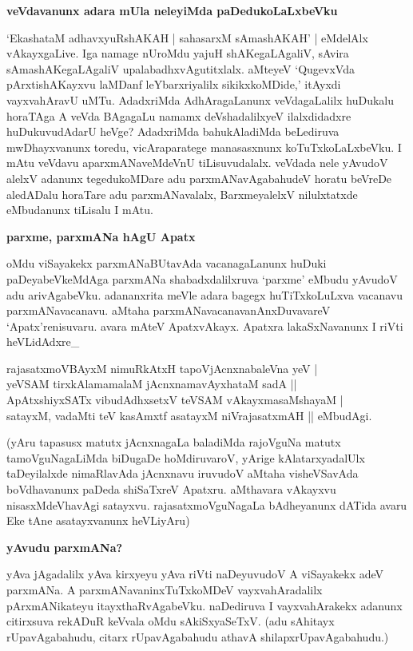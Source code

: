 {\bigskip
\noindent
{\large\bf veVdavanunx adara mUla neleyiMda paDedukoLaLxbeVku}}\label{page135}
\medskip

\noindent
`EkashataM adhavxyuRshAKAH | sahasarxM sAmashAKAH' |\label{135} eMdelAlx vAkayxgaLive. Iga namage nUroMdu yajuH shAKegaLAgaliV, sAvira sAmashAKegaLAgaliV upalabadhxvAgutitxlalx. aMteyeV `QugevxVda pArxtishAKayxvu laMDanf leYbarxriyalilx sikikxkoMDide,' itAyxdi vayxvahAravU uMTu. AdadxriMda AdhAragaLanunx veVdagaLalilx huDukalu horaTAga A veVda BAgagaLu namamx deVshadalilxyeV ilalxdidadxre huDukuvudAdarU heVge? AdadxriMda bahukAladiMda beLediruva mwDhayxvanunx toredu, vicAraparatege manasasxnunx koTuTxkoLaLxbeVku. I mAtu veVdavu aparxmANaveMdeVnU tiLisuvudalalx. veVdada nele yAvudoV alelxV adanunx tegedukoMDare adu parxmANavAgabahudeV horatu beVreDe aledADalu horaTare adu parxmANavalalx, BarxmeyalelxV nilulxtatxde eMbudanunx tiLisalu I mAtu.

{\bigskip
\noindent
{\large\bf parxme, parxmANa hAgU Apatx}}\label{page135a}
\medskip

\noindent
oMdu viSayakekx parxmANaBUtavAda vacanagaLanunx huDuki paDeyabeVkeMdAga parxmANa shabadxdalilxruva `parxme' eMbudu yAvudoV adu arivAgabeVku. adananxrita meVle adara bagegx huTiTxkoLuLxva vacanavu parxmANavacanavu. aMtaha parxmANavacanavanAnxDuvavareV `Apatx'renisuvaru. avara mAteV ApatxvAkayx. Apatxra lakaSxNavanunx I riVti heVLidAdxre\_

\begin{shloka}
rajasatxmoVBAyxM nimuRkAtxH tapoVjAcnxnabaleVna yeV |\\\label{135a}
yeVSAM tirxkAlamamalaM jAcnxnamavAyxhataM sadA ||\\
ApAtxshiyxSATx vibudAdhxsetxV teVSAM vAkayxmasaMshayaM |\\
satayxM, vadaMti teV kasAmxtf asatayxM niVrajasatxmAH || eMbudAgi.
\end{shloka}

\noindent
(yAru tapasusx matutx jAcnxnagaLa baladiMda rajoVguNa matutx tamoVguNagaLiMda biDugaDe hoMdiruvaroV, yArige kAlatarxyadalUlx taDeyilalxde nimaRlavAda jAcnxnavu iruvudoV aMtaha visheVSavAda boVdhavanunx paDeda shiSaTxreV Apatxru. aMthavara vAkayxvu nisasxMdeVhavAgi satayxvu. rajasatxmoVguNagaLa bAdheyanunx dATida avaru Eke tAne asatayxvanunx heVLiyAru)

{\bigskip
\noindent
{\large\bf yAvudu parxmANa?}}\label{page134a}
\medskip

\noindent
yAva jAgadalilx yAva kirxyeyu yAva riVti naDeyuvudoV A viSayakekx adeV parxmANa. A parxmANavaninxTuTxkoMDeV vayxvahAradalilx pArxmANikateyu itayxthaRvAgabeVku. naDediruva I vayxvahArakekx adanunx citirxsuva rekADuR keVvala oMdu sAkiSxyaSeTxV. (adu sAhitayx rUpavAgabahudu, citarx rUpavAgabahudu athavA shilapxrUpavAgabahudu.)

